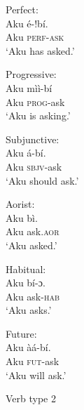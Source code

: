 \documentclass[output=paper
,newtxmath
,modfonts
,nonflat]{langsci/langscibook}
\begin{document}
\begin{minipage}{.5\textwidth}
\ea \label{ex:ollennu:2} Perfect:\\
\gll Aku \'e-!b\'i. \\
	Aku \textsc{\textsc{perf}-ask} \\
\glt `Aku has asked.'

\ex Progressive:\\
\gll Aku m\`i\`i-b\'i\\
Aku \textsc{prog}-ask\\
\glt `Aku is asking.'

\ex Subjunctive:\\
\gll Aku \'a-b\'i.\\
Aku \textsc{sbjv}-ask\\
\glt `Aku should ask.'
\z
\end{minipage} 
\begin{minipage}{.5\textwidth}
\ea Aorist:\\
\gll Aku b\`i.\\
Aku ask.\textsc{aor}\\
\glt `Aku asked.'

\ex Habitual:\\
\gll Aku b\'i-ɔ.\\
Aku ask-\textsc{hab}\\
\glt `Aku asks.'

\ex Future:\\
\gll Aku \`a\'a-b\'i.\\
Aku \textsc{fut}-ask\\
\glt `Aku will ask.'
\z
\end{minipage}

\medskip
Verb type 2
\medskip
\end{document}
